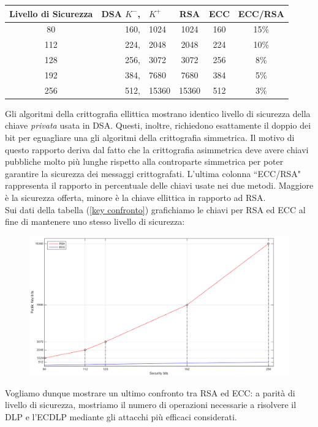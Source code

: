\documentclass[a4paper,12pt]{tesiinfo}
\begin{document}
\begin{center}
\begin{tabular}{c| r l| c| c| c}
    Livello di Sicurezza & DSA $K^-$, & $K^+$ & RSA & ECC & ECC/RSA\\
   \hline
    80 & 160, & 1024 & 1024 & 160 & 15\%\\
    112 & 224, & 2048 & 2048 & 224 & 10\%\\
    128 & 256, & 3072 & 3072 & 256 & 8\%\\
    192 & 384, & 7680 & 7680 & 384 & 5\%\\
    256 & 512, & 15360 & 15360 & 512 & 3\%
    \label{key confronto}
\end{tabular}
\end{center}
Gli algoritmi della crittografia ellittica mostrano identico livello di sicurezza della chiave \textit{privata} usata in DSA. Questi, inoltre, richiedono esattamente il doppio dei bit per eguagliare una gli algoritmi della crittografia simmetrica. Il motivo di questo rapporto deriva dal fatto che la crittografia asimmetrica deve avere chiavi pubbliche molto pi\`u lunghe rispetto alla controparte simmetrica per poter garantire la sicurezza dei messaggi crittografati. L'ultima colonna ``ECC/RSA" rappresenta il rapporto in percentuale delle chiavi usate nei due metodi. Maggiore \`e la sicurezza offerta, minore \`e la chiave ellittica in rapporto ad RSA.
\\
Sui dati della tabella (\ref{key confronto}) grafichiamo le chiavi per RSA ed ECC al fine di mantenere uno stesso livello di sicurezza:
\begin{figure}[H]
\includegraphics[scale=0.55]{RSAvECC_matlab}
 \label{rsaveccpercent}
\end{figure}
Vogliamo dunque mostrare un ultimo confronto tra RSA ed ECC: a parit\`a di livello di sicurezza, mostriamo il numero di operazioni necessarie a risolvere il DLP e l'ECDLP mediante gli attacchi pi\`u efficaci considerati.
\end{document}
